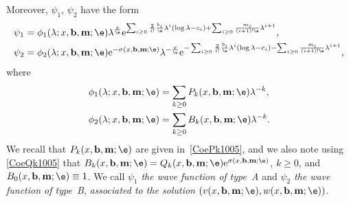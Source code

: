 Moreover, $\psi_1$, $\psi_2$ have the form
\begin{align}
&\psi_1 = \phi_1(\lambda; x, {\bf b}, {\bf m};\e) \lambda^{\frac{x}\e}
 {\rm e}^{\sum_{i\ge0} \frac{2}{i!} \frac{b_i}{\e} \lambda^i (\log \lambda-c_i)+\sum_{i\ge0} \frac{m_i}{(i+1)! \e} \lambda^{i+1}} , \label{psiphiform1} \\
&\psi_2 = \phi_2(\lambda; x, {\bf b}, {\bf m};\e) {\rm e}^{-\sigma(x,{\bf b},{\bf m};\e)} \lambda^{-\frac{x}\e}
 {\rm e}^{-\sum_{i\ge0} \frac{2}{i!} \frac{b_i}{\e} \lambda^i (\log \lambda-c_i)-\sum_{i\ge0} \frac{m_i}{(i+1)! \e} \lambda^{i+1}} , \label{psiphiform2}
\end{align}
where
\begin{align}
& \phi_1(\lambda; x, {\bf b}, {\bf m};\e) =\sum_{k\ge0} P_k(x, {\bf b}, {\bf m};\e) \lambda^{-k}, \label{phiexpansion1}\\
& \phi_2(\lambda; x, {\bf b}, {\bf m};\e) =\sum_{k\ge0} B_k(x, {\bf b}, {\bf m};\e) \lambda^{-k}. \label{phiexpansion2}
\end{align}
We recall that $P_k(x, {\bf b}, {\bf m};\e)$ are given in~\eqref{CoePk1005},
and we also note using \eqref{CoeQk1005} that $B_k(x, {\bf b}, {\bf m};\e)=Q_k(x, {\bf b},{\bf m};\e) {\rm e}^{\sigma(x, {\bf b},{\bf m};\e)}$, $k\geq 0$,
and $B_0(x, {\bf b}, {\bf m};\e)\equiv 1$.
We call $\psi_1$ {\it the wave function of type~A} and $\psi_2$ {\it the wave function of type~B},
{\it associated to the solution $(v(x, {\bf b}, {\bf m};\e), w(x, {\bf b}, {\bf m};\e))$}.

